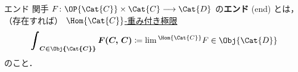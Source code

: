 \documentclass[TQFT_main]{subfiles}
\begin{document}
\begin{mydef}[label=def:end]{エンド}
    関手 $F \colon \OP{\Cat{C}} \times \Cat{C} \lto \Cat{D}$ の\textbf{エンド} (end) とは，（存在すれば）
    \hyperref[def:weighted-lim]{$\Hom{\Cat{C}}$-重み付き極限}
    \begin{align}
        \bm{\int_{C \in \Obj{\Cat{C}}} F(C,\, C)} \coloneqq \lim{}^{\Hom{\Cat{C}}} F \in \Obj{\Cat{D}}
    \end{align}
    のこと．
\end{mydef}

\end{document}
